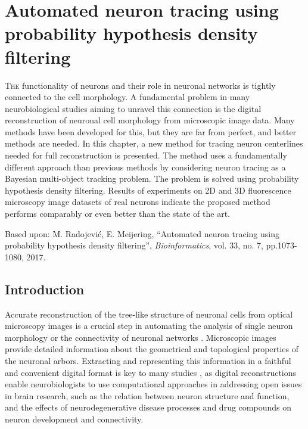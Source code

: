 %
%
\chpos{15mm}{8mm}
\chapter[Automated neuron tracing using probability hypothesis density filtering]{Automated neuron tracing using probability hypothesis density filtering}
\label{ch3:phd}
{\small \lettrine{T}{he} functionality of neurons and their role in neuronal networks is tightly connected to the cell morphology. A fundamental problem in many neurobiological studies aiming to unravel this connection is the digital reconstruction of neuronal cell morphology from microscopic image data. Many methods have been developed for this, but they are far from perfect, and better methods are needed. In this chapter, a new method for tracing neuron centerlines needed for full reconstruction is presented. The method uses a fundamentally different approach than previous methods by considering neuron tracing as a Bayesian multi-object tracking problem. The problem is solved using probability hypothesis density filtering. Results of experiments on 2D and 3D fluorescence microscopy image datasets of real neurons indicate the proposed method performs comparably or even better than the state of the art.\par}
\vspace*{22em}
\begin{publish}
	Based upon: M. Radojevi\'{c}, E. Meijering, ``Automated neuron tracing using probability hypothesis density filtering'', \textit{Bioinformatics}, vol. 33, no. 7, pp.1073-1080, 2017.   
\end{publish}

\section{Introduction}
\label{ch3:sec:introduction}
Accurate reconstruction of the tree-like structure of neuronal cells from optical microscopy images is a crucial step in automating the analysis of single neuron morphology or the connectivity of neuronal networks \cite{meijering2010neuron, donohue2011automated, peng2015bigneuron}. Microscopic images provide detailed information about the geometrical and topological properties of the neuronal arbors. Extracting and representing this information in a faithful and convenient digital format is key to many studies \cite{ascoli2002computational, ascoli2007neuromorpho, svoboda2011past, senft2011brief, halavi2012digital, lu2015quantitative}, as digital reconstructions enable neurobiologists to use computational approaches in addressing open issues in brain research, such as the relation between neuron structure and function, and the effects of neurodegenerative disease processes and drug compounds on neuron development and connectivity.

